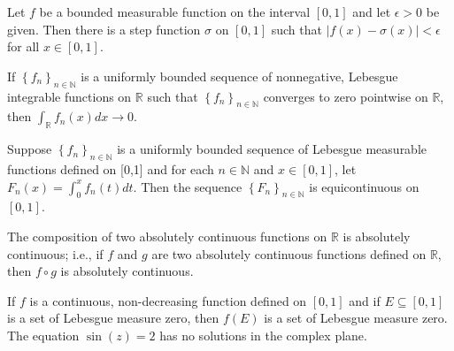 \documentclass[14pt]{extarticle}
\begin{document}
Let $f$ be a bounded measurable function on the interval $[0,1]$ and let $\epsilon>0$ be given. Then there is a step function $\sigma$ on $[0,1]$ such that $|f(x)-\sigma(x)|<\epsilon$ for all $x \in[0,1]$.
\newpage

If $\left\{f_{n}\right\}_{n \in \mathbb{N}}$ is a uniformly bounded sequence of nonnegative, Lebesgue integrable functions on $\mathbb{R}$ such that $\left\{f_{n}\right\}_{n \in \mathbb{N}}$ converges to zero pointwise on $\mathbb{R}$, then $\int_{\mathbb{R}} f_{n}(x) d x \rightarrow 0$.
\newpage

Suppose $\left\{f_{n}\right\}_{n \in \mathbb{N}}$ is a uniformly bounded sequence of Lebesgue measurable functions defined on [0,1] and for each $n \in \mathbb{N}$ and $x \in[0,1]$, let $F_{n}(x)=\int_{0}^{x} f_{n}(t) d t$. Then the sequence $\left\{F_{n}\right\}_{n \in \mathbb{N}}$ is equicontinuous on $[0,1]$.
\newpage

The composition of two absolutely continuous functions on $\mathbb{R}$ is absolutely continuous; i.e., if $f$ and $g$ are two absolutely continuous functions defined on $\mathbb{R}$, then $f \circ g$ is absolutely continuous.
\newpage

If $f$ is a continuous, non-decreasing function defined on $[0,1]$ and if $E \subseteq[0,1]$ is a set of Lebesgue measure zero, then $f(E)$ is a set of Lebesgue measure zero.
\newpage
The equation $\sin (z)=2$ has no solutions in the complex plane.
\newpage
\end{document}
